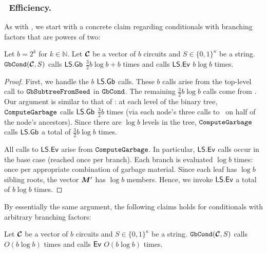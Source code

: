 \subsubsection{\gbcond\ Efficiency.}
As with \evcond, we start with a concrete claim
regarding conditionals with branching factors that are powers of two:

\begin{lemma}\label{lemma:gbcondtime}
  Let $b = 2^k$ for $k \in \mathbb{N}$.
  Let $\vec{\cir}$ be a vector of $b$ circuits and $S \in \{0,
  1\}^\kappa$ be a string.
  $\gbcond(\vec{\cir}, S)$ calls $\textsf{LS}.\textsf{Gb}$ $\frac{3}{2}b \log b + b$ times and calls
  $\textsf{LS}.\textsf{Ev}$ $b\log b$ times.
\end{lemma}
\begin{proof}
  First, we handle the $b$ $\textsf{LS}.\textsf{Gb}$ calls. These $b$ calls arise from the
  top-level call to $\mathtt{GbSubtreeFromSeed}$ in $\mathtt{GbCond}$.
  The remaining $\frac{3}{2} b \log b$ calls come from
  \computegarbage.
  Our argument is similar to that of :
  at each level of the binary tree, $\mathtt{ComputeGarbage}$ calls
  $\textsf{LS}.\textsf{Gb}$ $\frac{3}{2}b$ times (via each node's three calls to \gbtree\
  on half of the node's ancestors).
  Since there are $\log b$ levels in the tree, $\mathtt{ComputeGarbage}$ calls
  $\textsf{LS}.\textsf{Gb}$ a total of $\frac{3}{2}b \log b$ times.

  All calls to $\textsf{LS}.\textsf{Ev}$ arise from $\mathtt{ComputeGarbage}$.
  In particular, $\textsf{LS}.\textsf{Ev}$ calls occur in the base case (reached once per
  branch).
  Each branch is evaluated $\log b$ times: once per appropriate
  combination of garbage material. Since each leaf has $\log b$
  sibling roots, the vector $\vec{\mat}'$ has $\log b$ members.
  Hence, we invoke $\textsf{LS}.\textsf{Ev}$ a total of $b \log b$ times.
\end{proof}

By essentially the same argument, the following claims holds
for conditionals with arbitrary branching factors:
\begin{lemma}\label{lemma:gbcondtime-general}
  Let $\vec{\cir}$ be a vector of $b$ circuits and $S \in \{0,
  1\}^\kappa$ be a string.
  $\gbcond(\vec{\cir}, S)$ calls \gGb\ $O(b \log b)$ times and calls
  $\textsf{Ev}$ $O(b\log b)$ times.
\end{lemma}

